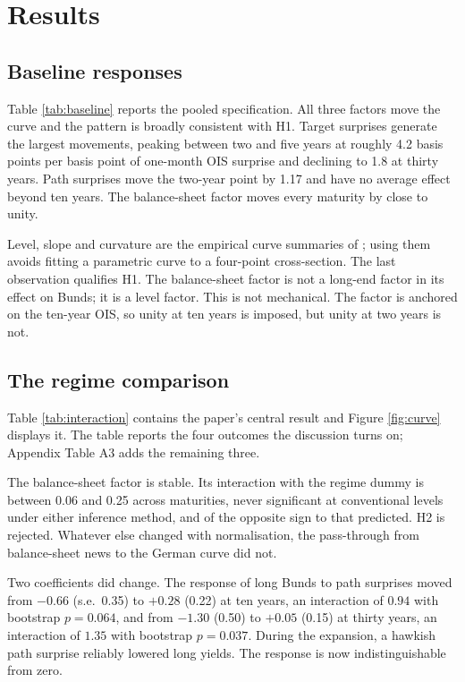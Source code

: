 \documentclass[11pt]{article}
\begin{document}
\section{Results}
\label{sec:results}

\subsection{Baseline responses}

Table \ref{tab:baseline} reports the pooled specification. All three factors move
the curve and the pattern is broadly consistent with H1. Target surprises
generate the largest movements, peaking between two and five years at roughly
4.2 basis points per basis point of one-month OIS surprise and declining to 1.8
at thirty years. Path surprises move the two-year point by 1.17 and have no
average effect beyond ten years. The balance-sheet factor moves every maturity by
close to unity.

Level, slope and curvature are the empirical curve summaries of
\citet{dieboldli2006}; using them avoids fitting a parametric curve to a
four-point cross-section. The last observation qualifies H1. The balance-sheet factor is not a long-end
factor in its effect on Bunds; it is a level factor. This is not mechanical.
The factor is anchored on the ten-year OIS, so unity at ten years is imposed, but
unity at two years is not.

\subsection{The regime comparison}

Table \ref{tab:interaction} contains the paper's central result and Figure
\ref{fig:curve} displays it. The table reports the four outcomes the discussion
turns on; Appendix Table A3 adds the remaining three.

The balance-sheet factor is stable. Its interaction with the regime dummy is
between 0.06 and 0.25 across maturities, never significant at conventional levels
under either inference method, and of the opposite sign to that predicted. H2 is
rejected. Whatever else changed with normalisation, the pass-through from
balance-sheet news to the German curve did not.

Two coefficients did change. The response of long Bunds to path surprises moved
from $-0.66$ (s.e.\ 0.35) to $+0.28$ (0.22) at ten years, an interaction of
$0.94$ with bootstrap $p = 0.064$, and from $-1.30$ (0.50) to $+0.05$ (0.15) at
thirty years, an interaction of $1.35$ with bootstrap $p = 0.037$. During the
expansion, a hawkish path surprise reliably lowered long yields. The response is
now indistinguishable from zero.
\end{document}
